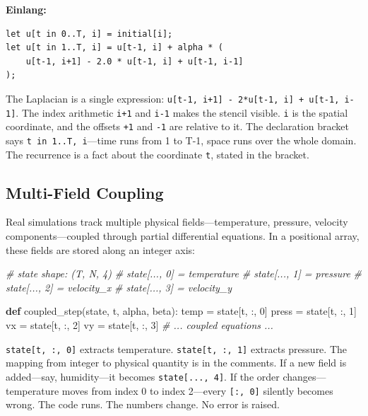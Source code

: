 \documentclass[11pt,titlepage]{article}
\newenvironment{Shaded}{}{}
\newcommand{\CommentTok}[1]{\textcolor[rgb]{0.38,0.63,0.69}{\textit{#1}}}
\newcommand{\DecValTok}[1]{\textcolor[rgb]{0.25,0.63,0.44}{#1}}
\newcommand{\KeywordTok}[1]{\textcolor[rgb]{0.00,0.44,0.13}{\textbf{#1}}}
\newcommand{\NormalTok}[1]{#1}
\newcommand{\OperatorTok}[1]{\textcolor[rgb]{0.40,0.40,0.40}{#1}}
\begin{document}
\textbf{Einlang:}

\begin{verbatim}
let u[t in 0..T, i] = initial[i];
let u[t in 1..T, i] = u[t-1, i] + alpha * (
    u[t-1, i+1] - 2.0 * u[t-1, i] + u[t-1, i-1]
);
\end{verbatim}

The Laplacian is a single expression:
\texttt{u{[}t-1,\ i+1{]}\ -\ 2*u{[}t-1,\ i{]}\ +\ u{[}t-1,\ i-1{]}}. The
index arithmetic \texttt{i+1} and \texttt{i-1} makes the stencil
visible. \texttt{i} is the spatial coordinate, and the offsets
\texttt{+1} and \texttt{-1} are relative to it. The declaration bracket
says \texttt{t\ in\ 1..T,\ i}---time runs from 1 to T-1, space runs over
the whole domain. The recurrence is a fact about the coordinate
\texttt{t}, stated in the bracket.

\vspace{2em}

\hypertarget{multi-field-coupling}{%
\subsection{Multi-Field Coupling}\label{multi-field-coupling}}

Real simulations track multiple physical fields---temperature, pressure,
velocity components---coupled through partial differential equations. In
a positional array, these fields are stored along an integer axis:

\begin{Shaded}
\begin{Highlighting}[]
\CommentTok{# state shape: (T, N, 4)}
\CommentTok{# state[..., 0] = temperature}
\CommentTok{# state[..., 1] = pressure}
\CommentTok{# state[..., 2] = velocity_x}
\CommentTok{# state[..., 3] = velocity_y}

\KeywordTok{def}\NormalTok{ coupled_step(state, t, alpha, beta):}
\NormalTok{    temp }\OperatorTok{=}\NormalTok{ state[t, :, }\DecValTok{0}\NormalTok{]}
\NormalTok{    press }\OperatorTok{=}\NormalTok{ state[t, :, }\DecValTok{1}\NormalTok{]}
\NormalTok{    vx }\OperatorTok{=}\NormalTok{ state[t, :, }\DecValTok{2}\NormalTok{]}
\NormalTok{    vy }\OperatorTok{=}\NormalTok{ state[t, :, }\DecValTok{3}\NormalTok{]}
    \CommentTok{# ... coupled equations ...}
\end{Highlighting}
\end{Shaded}

\texttt{state{[}t,\ :,\ 0{]}} extracts temperature.
\texttt{state{[}t,\ :,\ 1{]}} extracts pressure. The mapping from
integer to physical quantity is in the comments. If a new field is
added---say, humidity---it becomes \texttt{state{[}...,\ 4{]}}. If the
order changes---temperature moves from index 0 to index 2---every
\texttt{{[}:,\ 0{]}} silently becomes wrong. The code runs. The numbers
change. No error is raised.
\end{document}
